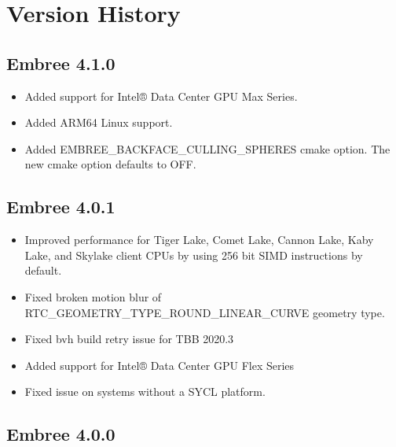 \section{Version History}\label{version-history}

\subsection{Embree 4.1.0}\label{embree-4.1.0}

\begin{itemize}
\tightlist
\item
  Added support for Intel® Data Center GPU Max Series.
\item
  Added ARM64 Linux support.
\item
  Added EMBREE\_BACKFACE\_CULLING\_SPHERES cmake option. The new cmake
  option defaults to OFF.
\end{itemize}

\subsection{Embree 4.0.1}\label{embree-4.0.1}

\begin{itemize}
\tightlist
\item
  Improved performance for Tiger Lake, Comet Lake, Cannon Lake, Kaby
  Lake, and Skylake client CPUs by using 256 bit SIMD instructions by
  default.
\item
  Fixed broken motion blur of RTC\_GEOMETRY\_TYPE\_ROUND\_LINEAR\_CURVE
  geometry type.
\item
  Fixed bvh build retry issue for TBB 2020.3
\item
  Added support for Intel® Data Center GPU Flex Series
\item
  Fixed issue on systems without a SYCL platform.
\end{itemize}

\subsection{Embree 4.0.0}\label{embree-4.0.0}

